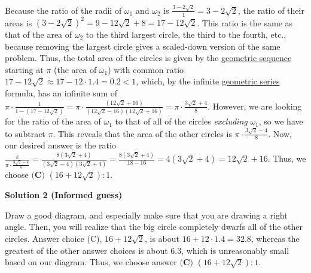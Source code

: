 \begin{enumerate}
 Because the ratio of the radii of $\omega_1$ and $\omega_2$ is $\frac{3-2\sqrt{2}}1=3-2\sqrt2$, the ratio of their areas is $(3-2\sqrt2)^2=9-12\sqrt2+8=17-12\sqrt2$. This ratio is the same as that of the area of $\omega_2$ to the third largest circle, the third to the fourth, etc., because removing the largest circle gives a scaled-down version of the same problem. Thus,  the total area of the circles is given by the \href{https://artofproblemsolving.com/wiki/index.php?title=Geometric\_sequence}{geometric sequence} starting at $\pi$ (the area of $\omega_1$) with common ratio $17-12\sqrt2\approx17-12\cdot1.4=0.2<1$, which, by the infinite \href{https://artofproblemsolving.com/wiki/index.php?title=Geometric\_series}{geometric series} formula, has an infinite sum of $\pi\cdot\frac1{1-(17-12\sqrt2)}=\pi\cdot\frac{(12\sqrt2+16)}{(12\sqrt2-16)(12\sqrt2+16)}=\pi\cdot\frac{3\sqrt2+4}8$. However, we are looking for the ratio of the area of $\omega_1$ to that of all of the circles \textit{excluding} $\omega_1$, so we have to subtract $\pi$. This reveals that the area of the other circles is $\pi\cdot\frac{3\sqrt2-4}8$. Now, our desired answer is the ratio $\frac{\pi}{\pi\cdot\frac{3\sqrt2-4}8}=\frac{8(3\sqrt2+4)}{(3\sqrt2-4)(3\sqrt2+4)}=\frac{8(3\sqrt2+4)}{18-16}=4(3\sqrt2+4)=12\sqrt2+16$. Thus, we choose $\boxed{\textbf{(C) }(16+12\sqrt2):1}$.

 



\textbf{Solution 2 (Informed guess)}

Draw a good diagram, and especially make sure that you are drawing a right angle. Then, you will realize that the big circle completely dwarfs all of the other circles. Answer choice (C), $16+12\sqrt2$, is about $16+12\cdot1.4=32.8$, whereas the greatest of the other answer choices is about $6.3$, which is unreasonably small based on our diagram. Thus, we choose answer $\boxed{\textbf{(C) }(16+12\sqrt2):1}$.

 


\end{enumerate}